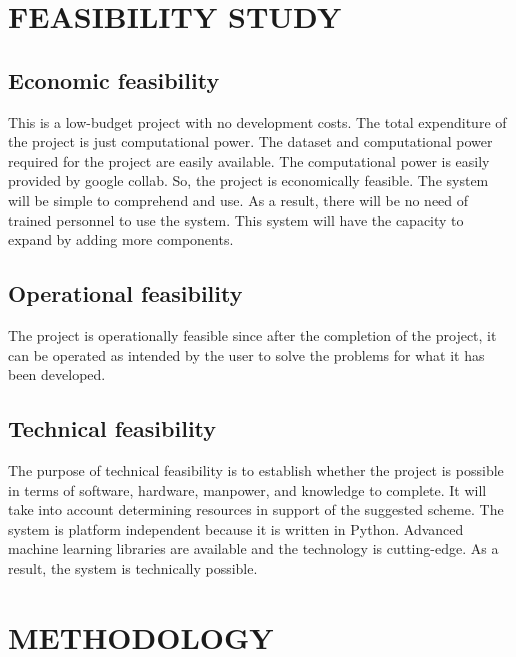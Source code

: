 \documentclass[12 pt]{article}
\begin{document}
\section{FEASIBILITY STUDY}
\subsection{Economic feasibility}
This is a low-budget project with no development costs. The total expenditure of the
project is just computational power. The dataset and computational power required for
the project are easily available. The computational power is easily provided by google
collab. So, the project is economically feasible. The system will be simple to
comprehend and use. As a result, there will be no need of trained personnel to use the
system. This system will have the capacity to expand by adding more components.

\subsection{Operational feasibility}
The project is operationally feasible since after the completion of the project, it can be
operated as intended by the user to solve the problems for what it has been developed.

\subsection{Technical feasibility}
The purpose of technical feasibility is to establish whether the project is possible in
terms of software, hardware, manpower, and knowledge to complete. It will take into
account determining resources in support of the suggested scheme. The system is
platform independent because it is written in Python. Advanced machine learning
libraries are available and the technology is cutting-edge. As a result, the system is
technically possible.
\newpage

\section{METHODOLOGY}
\end{document}
